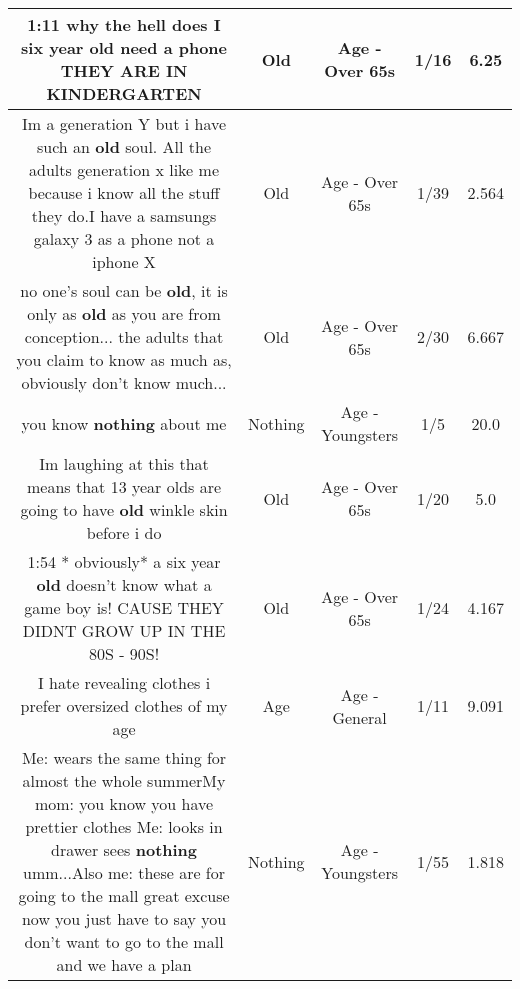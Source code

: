 \documentclass[11pt]{article}
\newlength\mylength
\begin{document}
\begin{center}
\begin{longtable}{|C{.65\mylength}|C{.30\mylength}|C{.12\mylength}|C{.12\mylength}|C{.12\mylength}|}
  \small 1:11 why the hell does I six year \textbf{old} need a phone THEY ARE IN KINDERGARTEN\normalsize   & Old & Age - Over 65s & 1/16 & 6.25 \\  \hline
  \small Im a generation Y but i have such an \textbf{old} soul. All the adults generation x like me because i know all the stuff they do.I have a samsungs galaxy 3 as a phone not a iphone X\normalsize   & Old & Age - Over 65s & 1/39 & 2.564 \\  \hline
  \small no one's soul can be \textbf{old}, it is only as \textbf{old} as you are from conception... the adults that you claim to know as much as, obviously don't know much...\normalsize   & Old & Age - Over 65s & 2/30 & 6.667 \\  \hline
  \small you know \textbf{nothing} about me\normalsize   & Nothing & Age - Youngsters & 1/5 & 20.0 \\  \hline
  \small Im laughing at this that means that 13 year olds are going to have \textbf{old} winkle skin before i do\normalsize   & Old & Age - Over 65s & 1/20 & 5.0 \\  \hline
  \small 1:54   * obviously* a six year \textbf{old} doesn't know what a game boy is! CAUSE THEY DIDNT GROW UP IN THE 80S - 90S!\normalsize   & Old & Age - Over 65s & 1/24 & 4.167 \\  \hline
  \small I hate revealing clothes i prefer oversized clothes of my age\normalsize   & Age & Age - General & 1/11 & 9.091 \\  \hline
  \small Me: wears the same thing for almost the whole summerMy mom: you know you have prettier clothes Me: looks in drawer sees \textbf{nothing} umm...Also me: these are for going to the mall great excuse now you just have to say you don't want to go to the mall and we have a plan\normalsize   & Nothing & Age - Youngsters & 1/55 & 1.818 \\  \hline

\end{longtable}
\end{center}
\end{document}
